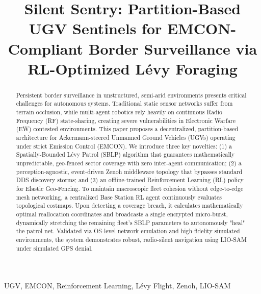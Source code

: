 \documentclass[conference]{IEEEtran}
\begin{document}
\title{Silent Sentry: Partition-Based UGV Sentinels for EMCON-Compliant Border Surveillance via RL-Optimized Lévy Foraging}


\maketitle

\begin{abstract}
Persistent border surveillance in unstructured, semi-arid environments presents critical challenges for autonomous systems. Traditional static sensor networks suffer from terrain occlusion, while multi-agent robotics rely heavily on continuous Radio Frequency (RF) state-sharing, creating severe vulnerabilities in Electronic Warfare (EW) contested environments. This paper proposes a decentralized, partition-based architecture for Ackermann-steered Unmanned Ground Vehicles (UGVs) operating under strict Emission Control (EMCON). We introduce three key novelties: (1) a Spatially-Bounded Lévy Patrol (SBLP) algorithm that guarantees mathematically unpredictable, geo-fenced sector coverage with zero inter-agent communication; (2) a perception-agnostic, event-driven Zenoh middleware topology that bypasses standard DDS discovery storms; and (3) an offline-trained Reinforcement Learning (RL) policy for Elastic Geo-Fencing. To maintain macroscopic fleet cohesion without edge-to-edge mesh networking, a centralized Base Station RL agent continuously evaluates topological costmaps. Upon detecting a coverage breach, it calculates mathematically optimal reallocation coordinates and broadcasts a single encrypted micro-burst, dynamically stretching the remaining fleet's SBLP parameters to autonomously "heal" the patrol net. Validated via OS-level network emulation and high-fidelity simulated environments, the system demonstrates robust, radio-silent navigation using LIO-SAM under simulated GPS denial.
\end{abstract}

\begin{IEEEkeywords}
UGV, EMCON, Reinforcement Learning, Lévy Flight, Zenoh, LIO-SAM
\end{IEEEkeywords}
\end{document}
